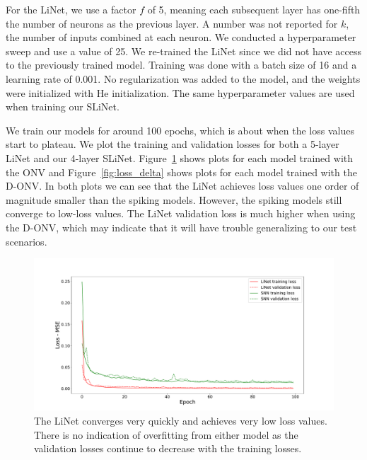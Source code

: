 \documentclass [MS] {UCLAthesis}
\begin{document}
For the LiNet, we use a factor $f$ of 5, meaning each subsequent layer has one-fifth the number of neurons as the previous layer. A number was not reported for $k$, the number of inputs combined at each neuron. We conducted a hyperparameter sweep and use a value of 25. We re-trained the LiNet since we did not have access to the previously trained model. Training was done with a batch size of 16 and a learning rate of 0.001. No regularization was added to the model, and the weights were initialized with He initialization. 
The same hyperparameter values are used when training our SLiNet.

We train our models for around 100 epochs, which is about when the loss values start to plateau. We plot the training and validation losses for both a 5-layer LiNet and our 4-layer SLiNet. Figure~\ref{fig:loss_normal} shows plots for each model trained with the ONV and Figure~\ref{fig:loss_delta} shows plots for each model trained with the D-ONV. In both plots we can see that the LiNet achieves loss values one order of magnitude smaller than the spiking models. However, the spiking models still converge to low-loss values. The LiNet validation loss is much higher when using the D-ONV, which may indicate that it will have trouble generalizing to our test scenarios.


\begin{figure}
    \centering
    \includegraphics[width=\textwidth]{loss_normal}
    \caption[Training and validation loss using ONVs]{The LiNet converges very quickly and achieves very low loss values. There is no indication of overfitting from either model as the validation losses continue to decrease with the training losses.}
    \label{fig:loss_normal}
\end{figure}
\end{document}

